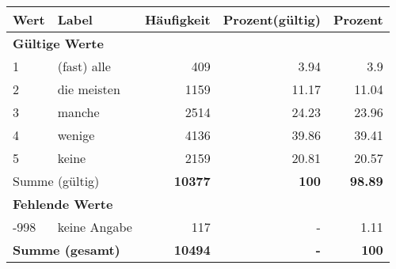     \begin{longtable}{lXrrr}
     \toprule
     \textbf{Wert} & \textbf{Label} & \textbf{Häufigkeit} & \textbf{Prozent(gültig)} & \textbf{Prozent} \\
     \endhead
     \midrule
     \multicolumn{5}{l}{\textbf{Gültige Werte}}\\

     1 &
     \multicolumn{1}{X}{ (fast) alle   } &


       \num{409} &
       \num[round-mode=places,round-precision=2]{3.94} &
         \num[round-mode=places,round-precision=2]{3.9} \\

     2 &
     \multicolumn{1}{X}{ die meisten   } &


       \num{1159} &
       \num[round-mode=places,round-precision=2]{11.17} &
         \num[round-mode=places,round-precision=2]{11.04} \\

     3 &
     \multicolumn{1}{X}{ manche   } &


       \num{2514} &
       \num[round-mode=places,round-precision=2]{24.23} &
         \num[round-mode=places,round-precision=2]{23.96} \\

     4 &
     \multicolumn{1}{X}{ wenige   } &


       \num{4136} &
       \num[round-mode=places,round-precision=2]{39.86} &
         \num[round-mode=places,round-precision=2]{39.41} \\

     5 &
     \multicolumn{1}{X}{ keine   } &


       \num{2159} &
       \num[round-mode=places,round-precision=2]{20.81} &
         \num[round-mode=places,round-precision=2]{20.57} \\
     \midrule
     \multicolumn{2}{l}{Summe (gültig)} &
       \textbf{\num{10377}} &
     \textbf{\num{100}} &
       \textbf{\num[round-mode=places,round-precision=2]{98.89}} \\
     \multicolumn{5}{l}{\textbf{Fehlende Werte}}\\
       -998 &
       keine Angabe &
         \num{117} &
        - &
         \num[round-mode=places,round-precision=2]{1.11} \\
     \midrule
     \multicolumn{2}{l}{\textbf{Summe (gesamt)}} &
          \textbf{\num{10494}} &
        \textbf{-} &
        \textbf{\num{100}} \\
     \bottomrule
     \end{longtable}
     

